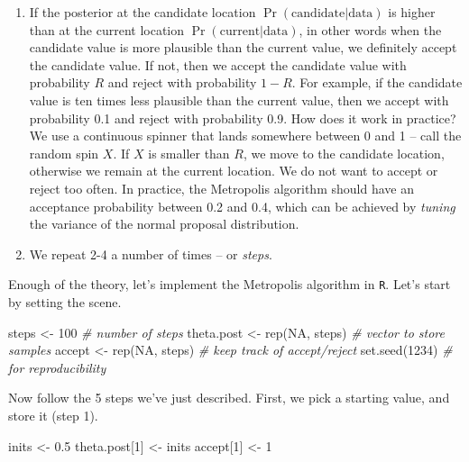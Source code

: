 \documentclass[
  12pt,
]{krantz}
\newenvironment{Shaded}{\begin{snugshade}}{\end{snugshade}}
\newcommand{\CommentTok}[1]{\textcolor[rgb]{0.56,0.35,0.01}{\textit{#1}}}
\newcommand{\ConstantTok}[1]{\textcolor[rgb]{0.00,0.00,0.00}{#1}}
\newcommand{\DecValTok}[1]{\textcolor[rgb]{0.00,0.00,0.81}{#1}}
\newcommand{\FloatTok}[1]{\textcolor[rgb]{0.00,0.00,0.81}{#1}}
\newcommand{\FunctionTok}[1]{\textcolor[rgb]{0.00,0.00,0.00}{#1}}
\newcommand{\NormalTok}[1]{#1}
\newcommand{\OtherTok}[1]{\textcolor[rgb]{0.56,0.35,0.01}{#1}}
\begin{document}
\begin{enumerate}
\def\labelenumi{\arabic{enumi}.}
\setcounter{enumi}{3}
\item
  If the posterior at the candidate location \(\Pr(\text{candidate}|\text{data})\) is higher than at the current location \(\Pr(\text{current}|\text{data})\), in other words when the candidate value is more plausible than the current value, we definitely accept the candidate value. If not, then we accept the candidate value with probability \(R\) and reject with probability \(1-R\). For example, if the candidate value is ten times less plausible than the current value, then we accept with probability 0.1 and reject with probability 0.9. How does it work in practice? We use a continuous spinner that lands somewhere between 0 and 1 -- call the random spin \(X\). If \(X\) is smaller than \(R\), we move to the candidate location, otherwise we remain at the current location. We do not want to accept or reject too often. In practice, the Metropolis algorithm should have an acceptance probability between 0.2 and 0.4, which can be achieved by \emph{tuning} the variance of the normal proposal distribution.
\item
  We repeat 2-4 a number of times -- or \emph{steps}.
\end{enumerate}

Enough of the theory, let's implement the Metropolis algorithm in \texttt{R}. Let's start by setting the scene.

\begin{Shaded}
\begin{Highlighting}[]
\NormalTok{steps }\OtherTok{\textless{}{-}} \DecValTok{100} \CommentTok{\# number of steps}
\NormalTok{theta.post }\OtherTok{\textless{}{-}} \FunctionTok{rep}\NormalTok{(}\ConstantTok{NA}\NormalTok{, steps) }\CommentTok{\# vector to store samples}
\NormalTok{accept }\OtherTok{\textless{}{-}} \FunctionTok{rep}\NormalTok{(}\ConstantTok{NA}\NormalTok{, steps) }\CommentTok{\# keep track of accept/reject}
\FunctionTok{set.seed}\NormalTok{(}\DecValTok{1234}\NormalTok{) }\CommentTok{\# for reproducibility}
\end{Highlighting}
\end{Shaded}

Now follow the 5 steps we've just described. First, we pick a starting value, and store it (step 1).

\begin{Shaded}
\begin{Highlighting}[]
\NormalTok{inits }\OtherTok{\textless{}{-}} \FloatTok{0.5}
\NormalTok{theta.post[}\DecValTok{1}\NormalTok{] }\OtherTok{\textless{}{-}}\NormalTok{ inits}
\NormalTok{accept[}\DecValTok{1}\NormalTok{] }\OtherTok{\textless{}{-}} \DecValTok{1}
\end{Highlighting}
\end{Shaded}
\end{document}
